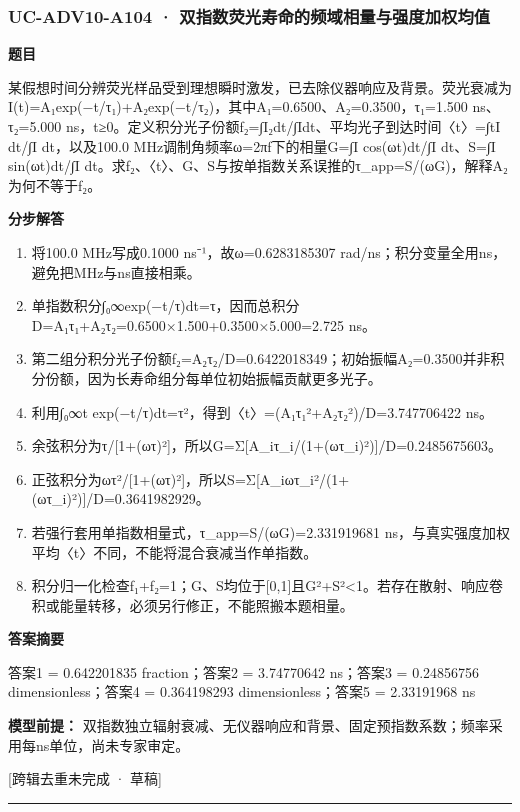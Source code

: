 \documentclass[UTF8,11pt,a4paper]{ctexart}
\begin{document}
\subsubsection*{UC-ADV10-A104 · 双指数荧光寿命的频域相量与强度加权均值}
\noindent\textbf{题目}\par
某假想时间分辨荧光样品受到理想瞬时激发，已去除仪器响应及背景。荧光衰减为I(t)=A₁exp(−t/τ₁)+A₂exp(−t/τ₂)，其中A₁=0.6500、A₂=0.3500，τ₁=1.500 ns、τ₂=5.000 ns，t≥0。定义积分光子份额f₂=∫I₂dt/∫Idt、平均光子到达时间〈t〉=∫tI dt/∫I dt，以及100.0 MHz调制角频率ω=2πf下的相量G=∫I cos(ωt)dt/∫I dt、S=∫I sin(ωt)dt/∫I dt。求f₂、〈t〉、G、S与按单指数关系误推的τ\_app=S/(ωG)，解释A₂为何不等于f₂。\par
\medskip\noindent\textbf{分步解答}
\begin{enumerate}
\item 将100.0 MHz写成0.1000 ns⁻¹，故ω=0.6283185307 rad/ns；积分变量全用ns，避免把MHz与ns直接相乘。
\item 单指数积分∫₀∞exp(−t/τ)dt=τ，因而总积分D=A₁τ₁+A₂τ₂=0.6500×1.500+0.3500×5.000=2.725 ns。
\item 第二组分积分光子份额f₂=A₂τ₂/D=0.6422018349；初始振幅A₂=0.3500并非积分份额，因为长寿命组分每单位初始振幅贡献更多光子。
\item 利用∫₀∞t exp(−t/τ)dt=τ²，得到〈t〉=(A₁τ₁²+A₂τ₂²)/D=3.747706422 ns。
\item 余弦积分为τ/[1+(ωτ)²]，所以G=Σ[A\_iτ\_i/(1+(ωτ\_i)²)]/D=0.2485675603。
\item 正弦积分为ωτ²/[1+(ωτ)²]，所以S=Σ[A\_iωτ\_i²/(1+(ωτ\_i)²)]/D=0.3641982929。
\item 若强行套用单指数相量式，τ\_app=S/(ωG)=2.331919681 ns，与真实强度加权平均〈t〉不同，不能将混合衰减当作单指数。
\item 积分归一化检查f₁+f₂=1；G、S均位于[0,1]且G²+S²<1。若存在散射、响应卷积或能量转移，必须另行修正，不能照搬本题相量。
\end{enumerate}
\noindent\textbf{答案摘要}\par
答案1 = 0.642201835 fraction；答案2 = 3.74770642 ns；答案3 = 0.24856756 dimensionless；答案4 = 0.364198293 dimensionless；答案5 = 2.33191968 ns\par
\noindent\textbf{模型前提：}
双指数独立辐射衰减、无仪器响应和背景、固定预指数系数；频率采用每ns单位，尚未专家审定。\par
\noindent\textcolor{red!65!black}{[跨辑去重未完成 · 草稿]} \par
\medskip\hrule\medskip
{}
\end{document}

